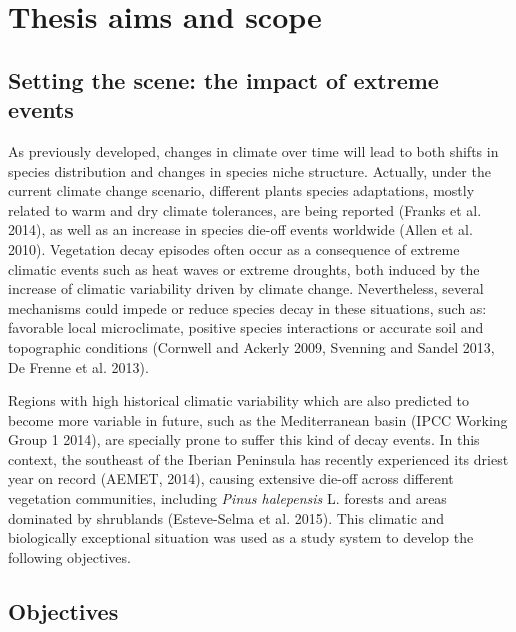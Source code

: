 \documentclass[11pt,twoside]{reedthesis}
\begin{document}
\section{Thesis aims and scope}\label{thesis-aims-and-scope}

\subsection{Setting the scene: the impact of extreme
events}\label{setting-the-scene-the-impact-of-extreme-events}

\par

As previously developed, changes in climate over time will lead to both
shifts in species distribution and changes in species niche structure.
Actually, under the current climate change scenario, different plants
species adaptations, mostly related to warm and dry climate tolerances,
are being reported (Franks et al. 2014), as well as an increase in
species die-off events worldwide (Allen et al. 2010). Vegetation decay
episodes often occur as a consequence of extreme climatic events such as
heat waves or extreme droughts, both induced by the increase of climatic
variability driven by climate change. Nevertheless, several mechanisms
could impede or reduce species decay in these situations, such as:
favorable local microclimate, positive species interactions or accurate
soil and topographic conditions (Cornwell and Ackerly 2009, Svenning and
Sandel 2013, De Frenne et al. 2013).\par

Regions with high historical climatic variability which are also
predicted to become more variable in future, such as the Mediterranean
basin (IPCC Working Group 1 2014), are specially prone to suffer this
kind of decay events. In this context, the southeast of the Iberian
Peninsula has recently experienced its driest year on record (AEMET,
2014), causing extensive die-off across different vegetation
communities, including \emph{Pinus halepensis} L. forests and areas
dominated by shrublands (Esteve-Selma et al. 2015). This climatic and
biologically exceptional situation was used as a study system to develop
the following objectives.\par

\subsection{Objectives}\label{objectives}
\end{document}
